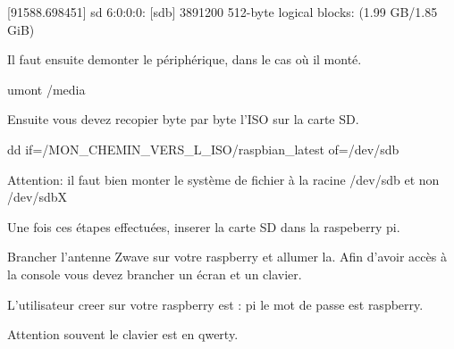 [91588.698451] sd 6:0:0:0: [sdb] 3891200 512-byte logical blocks: (1.99 GB/1.85 GiB)

Il faut ensuite demonter le périphérique, dans le cas où il monté.

umont /media

Ensuite vous devez recopier byte par byte l'ISO sur la carte SD.

dd if=/MON\_CHEMIN\_VERS\_L\_ISO/raspbian\_latest of=/dev/sdb

Attention: il faut bien monter le système de fichier à la racine /dev/sdb et non /dev/sdbX 

Une fois ces étapes effectuées, inserer la carte SD dans la raspeberry pi.

Brancher l'antenne Zwave sur votre raspberry et allumer la.
Afin d'avoir accès à la console vous devez brancher un écran et un clavier. 

L'utilisateur creer sur votre raspberry est : pi
le mot de passe est raspberry. 

Attention souvent le clavier est en qwerty.





